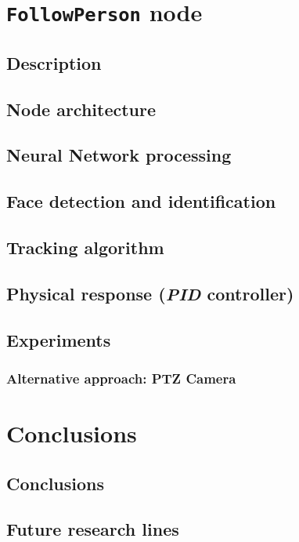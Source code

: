 \chapter{\texttt{FollowPerson} node}
\label{chap:followperson}
\section{Description}
\section{Node architecture}
\section{Neural Network processing}
\section{Face detection and identification}
\section{Tracking algorithm}
\section{Physical response (\emph{PID} controller)}
\section{Experiments}
\subsection{Alternative approach: PTZ Camera}
\label{sec:follow_ptz}


\chapter{Conclusions}
	\section{Conclusions}
	\section{Future research lines}
